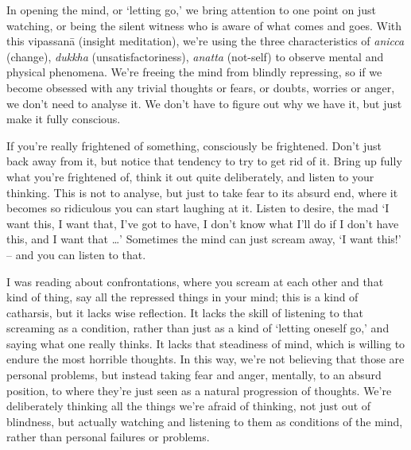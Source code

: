 
In opening the mind, or `letting go,' we bring attention to one point on just watching, or being the silent witness who is aware of what comes and goes. With this vipassanā (insight meditation), we're using the three characteristics of \textit{anicca} (change), \textit{dukkha} (unsatisfactoriness), \textit{anatta} (not-self) to observe mental and physical phenomena. We're freeing the mind from blindly repressing, so if we become obsessed with any trivial thoughts or fears, or doubts, worries or anger, we don't need to analyse it. We don't have to figure out why we have it, but just make it fully conscious.

If you're really frightened of something, consciously be frightened. Don't just back away from it, but notice that tendency to try to get rid of it. Bring up fully what you're frightened of, think it out quite deliberately, and listen to your thinking. This is not to analyse, but just to take fear to its absurd end, where it becomes so ridiculous you can start laughing at it. Listen to desire, the mad `I want this, I want that, I've got to have, I don't know what I'll do if I don't have this, and I want that \ldots{}' Sometimes the mind can just scream away, `I want this!' -- and you can listen to that.

I was reading about confrontations, where you scream at each other and that kind of thing, say all the repressed things in your mind; this is a kind of catharsis, but it lacks wise reflection. It lacks the skill of listening to that screaming as a condition, rather than just as a kind of `letting oneself go,' and saying what one really thinks. It lacks that steadiness of mind, which is willing to endure the most horrible thoughts. In this way, we're not believing that those are personal problems, but instead taking fear and anger, mentally, to an absurd position, to where they're just seen as a natural progression of thoughts. We're deliberately thinking all the things we're afraid of thinking, not just out of blindness, but actually watching and listening to them as conditions of the mind, rather than personal failures or problems.

